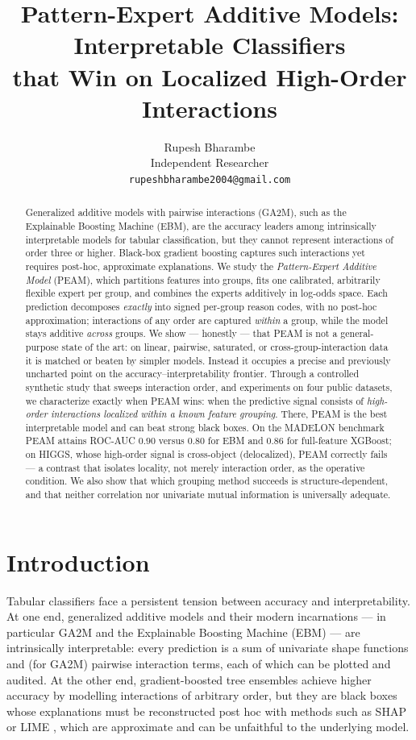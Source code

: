 \documentclass{article}
\title{Pattern-Expert Additive Models: Interpretable Classifiers\\ that Win on Localized High-Order Interactions}
\author{Rupesh Bharambe\\
Independent Researcher\\
\texttt{rupeshbharambe2004@gmail.com}}
\begin{document}
\maketitle

\begin{abstract}
Generalized additive models with pairwise interactions (GA2M), such as the
Explainable Boosting Machine (EBM), are the accuracy leaders among intrinsically
interpretable models for tabular classification, but they cannot represent
interactions of order three or higher. Black-box gradient boosting captures such
interactions yet requires post-hoc, approximate explanations. We study the
\emph{Pattern-Expert Additive Model} (PEAM), which partitions features into
groups, fits one calibrated, arbitrarily flexible expert per group, and combines
the experts additively in log-odds space. Each prediction decomposes
\emph{exactly} into signed per-group reason codes, with no post-hoc
approximation; interactions of any order are captured \emph{within} a group,
while the model stays additive \emph{across} groups. We show --- honestly --- that
PEAM is not a general-purpose state of the art: on linear, pairwise, saturated,
or cross-group-interaction data it is matched or beaten by simpler models.
Instead it occupies a precise and previously uncharted point on the
accuracy--interpretability frontier. Through a controlled synthetic study that
sweeps interaction order, and experiments on four public datasets, we
characterize exactly when PEAM wins: when the predictive signal consists of
\emph{high-order interactions localized within a known feature grouping}. There,
PEAM is the best interpretable model and can beat strong black boxes. On the
MADELON benchmark PEAM attains ROC-AUC $0.90$ versus $0.80$ for EBM and $0.86$
for full-feature XGBoost; on HIGGS, whose high-order signal is cross-object
(delocalized), PEAM correctly fails --- a contrast that isolates locality, not
merely interaction order, as the operative condition. We also show that which
grouping method succeeds is structure-dependent, and that neither correlation
nor univariate mutual information is universally adequate.
\end{abstract}

\section{Introduction}

Tabular classifiers face a persistent tension between accuracy and
interpretability. At one end, generalized additive models
\citep{hastie1990gam} and their modern incarnations --- in particular GA2M and
the Explainable Boosting Machine (EBM) \citep{lou2013ga2m,caruana2015intelligible,nori2019interpretml}
--- are intrinsically interpretable: every prediction is a sum of univariate shape
functions and (for GA2M) pairwise interaction terms, each of which can be plotted
and audited. At the other end, gradient-boosted tree ensembles
\citep{chen2016xgboost,ke2017lightgbm} achieve higher accuracy by modelling
interactions of arbitrary order, but they are black boxes whose explanations must
be reconstructed post hoc with methods such as SHAP \citep{lundberg2017shap} or
LIME \citep{ribeiro2016lime}, which are approximate and can be unfaithful to the
underlying model.
\end{document}
